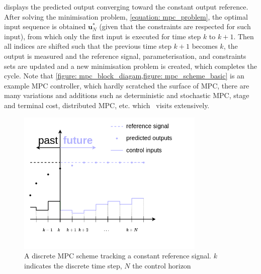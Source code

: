  displays the predicted output converging toward the constant output reference. After solving the minimisation problem, \cref{equation: mpc_problem}, the optimal input sequence is obtained $\mathbf{u}^*_N$ (given that the constraints are respected for such input), from which only the first input is executed for time step $k$ to $k+1$. Then all indices are shifted such that the previous time step $k+1$ becomes $k$, the output is measured and the reference signal, parameterisation, and constraints sets are updated and a new minimisation problem is created, which completes the cycle. Note that \cref{figure: mpc_block_diagam,figure: mpc_scheme_basic} is an example \ac{MPC} controller, which hardly scratched the surface of \ac{MPC}, there are many variations and additions such as deterministic and stochastic \ac{MPC}, stage and terminal cost, distributed \ac{MPC}, etc. which~\cite{rawlings_model_2020} visits extensively. 

\begin{figure}[H]
    \centering
    \includegraphics[width=0.8\textwidth]{figures/appendix/MPC_simple_diagram.png}
    \caption{A discrete \acs{MPC} scheme tracking a constant reference signal. $k$ indicates the discrete time step, $N$ the control horizon}
    \label{figure: mpc_scheme_basic}
\end{figure}

